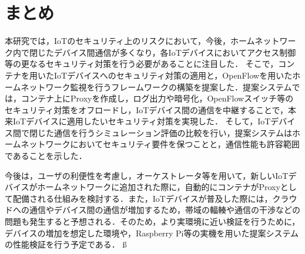 \documentclass[a4paper,10pt,twocolumn,uplatex]{jsarticle}
\begin{document}
\section{まとめ}
本研究では，IoTのセキュリティ上のリスクにおいて，今後，ホームネットワーク内で閉じたデバイス間通信が多くなり，各IoTデバイスにおいてアクセス制御等の更なるセキュリティ対策を行う必要があることに注目した．
そこで，コンテナを用いたIoTデバイスへのセキュリティ対策の適用と，OpenFlowを用いたホームネットワーク監視を行うフレームワークの構築を提案した．提案システムでは，コンテナ上にProxyを作成し，ログ出力や暗号化，OpenFlowスイッチ等のセキュリティ対策をオフロードし，IoTデバイス間の通信を中継することで，本来IoTデバイスに適用したいセキュリティ対策を実現した．
そして，IoTデバイス間で閉じた通信を行うシミュレーション評価の比較を行い，提案システムはホームネットワークにおいてセキュリティ要件を保つことと，通信性能も許容範囲であることを示した．\par
今後は，ユーザの利便性を考慮し，オーケストレータ等を用いて，新しいIoTデバイスがホームネットワークに追加された際に，自動的にコンテナがProxyとして配備される仕組みを検討する．また，IoTデバイスが普及した際には，クラウドへの通信やデバイス間の通信が増加するため，帯域の輻輳や通信の干渉などの問題も発生すると予想される．そのため，より実環境に近い検証を行うために，デバイスの増加を想定した環境や，Raspberry Pi等の実機を用いた提案システムの性能検証を行う予定である．
ß
\end{document}
